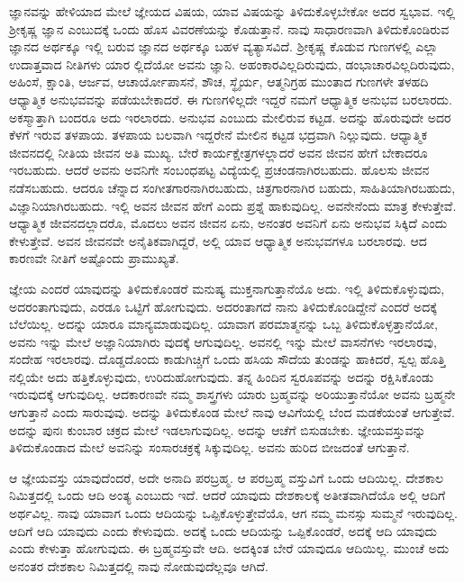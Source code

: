 ಜ್ಞಾನವನ್ನು ಹೇಳಿಯಾದ ಮೇಲೆ ಜ್ಞೇಯದ ವಿಷಯ, ಯಾವ ವಿಷಯನ್ನು ತಿಳಿದುಕೊಳ್ಳಬೇಕೋ ಅದರ ಸ್ವಭಾವ. ಇಲ್ಲಿ ಶ‍್ರೀಕೃಷ್ಣ ಜ್ಞಾನ ಎಂಬುದಕ್ಕೆ ಒಂದು ಹೊಸ ವಿವರಣೆಯನ್ನು ಕೊಡುತ್ತಾನೆ. ನಾವು ಸಾಧಾರಣವಾಗಿ ತಿಳಿದುಕೊಂಡಿರುವ ಜ್ಞಾನದ ಅರ್ಥಕ್ಕೂ ಇಲ್ಲಿ ಬರುವ ಜ್ಞಾನದ ಅರ್ಥಕ್ಕೂ ಬಹಳ ವ್ಯತ್ಯಾಸವಿದೆ. ಶ‍್ರೀಕೃಷ್ಣ ಕೊಡುವ ಗುಣಗಳಲ್ಲಿ ಎಲ್ಲಾ ಉದಾತ್ತವಾದ ನೀತಿಗಳು ಯಾರ ಲ್ಲಿದೆಯೋ ಅವನು ಜ್ಞಾನಿ. ಅಹಂಕಾರವಿಲ್ಲದಿರುವುದು, ಡಂಭಾಚಾರವಿಲ್ಲದಿರುವುದು, ಅಹಿಂಸೆ, ಕ್ಷಾಂತಿ, ಆರ್ಜವ, ಆಚಾರ್ಯೋಪಾಸನೆ, ಶೌಚ, ಸ್ಥೈರ್ಯ, ಆತ್ಮನಿಗ್ರಹ ಮುಂತಾದ ಗುಣಗಳೇ ತಳಹದಿ ಆಧ್ಯಾತ್ಮಿಕ ಅನುಭವವನ್ನು ಪಡೆಯಬೇಕಾದರೆ. ಈ ಗುಣಗಳಿಲ್ಲದೇ ಇದ್ದರೆ ನಮಗೆ ಆಧ್ಯಾತ್ಮಿಕ ಅನುಭವ ಬರಲಾರದು. ಅಕಸ್ಮಾತ್ತಾಗಿ ಬಂದರೂ ಅದು ಇರಲಾರದು. ಅನುಭವ ಎಂಬುದು ಮೇಲಿರುವ ಕಟ್ಟಡ. ಅದನ್ನು ಹೊರುವುದೇ ಅದರ ಕೆಳಗೆ ಇರುವ ತಳಪಾಯ. ತಳಪಾಯ ಬಲವಾಗಿ ಇದ್ದರೇನೆ ಮೇಲಿನ ಕಟ್ಟಡ ಭದ್ರವಾಗಿ ನಿಲ್ಲುವುದು. ಆಧ್ಯಾತ್ಮಿಕ ಜೀವನದಲ್ಲಿ ನೀತಿಯ ಜೀವನ ಅತಿ ಮುಖ್ಯ. ಬೇರೆ ಕಾರ್ಯಕ್ಷೇತ್ರಗಳಲ್ಲಾದರೆ ಅವನ ಜೀವನ ಹೇಗೆ ಬೇಕಾದರೂ ಇರಬಹುದು. ಆದರೆ ಅವನು ಅವನಿಗೇ ಸಂಬಂಧಪಟ್ಟ ವಿದ್ಯೆಯಲ್ಲಿ ಪ್ರಚಂಡನಾಗಿರಬಹುದು. ಹೊಲಸು ಜೀವನ ನಡೆಸಬಹುದು. ಆದರೂ ಚೆನ್ನಾದ ಸಂಗೀತಗಾರನಾಗಿರಬಹುದು, ಚಿತ್ರಗಾರನಾಗಿರ ಬಹುದು, ಸಾಹಿತಿಯಾಗಿರಬಹುದು, ವಿಜ್ಞಾನಿಯಾಗಿರಬಹುದು. ಇಲ್ಲಿ ಅವನ ಜೀವನ ಹೇಗೆ ಎಂದು ಪ್ರಶ್ನೆ ಹಾಕುವುದಿಲ್ಲ. ಅವನೇನೆಂದು ಮಾತ್ರ ಕೇಳುತ್ತೇವೆ. ಆಧ್ಯಾತ್ಮಿಕ ಜೀವನದಲ್ಲಾದರೊ, ಮೊದಲು ಅವನ ಜೀವನ ಏನು, ಅನಂತರ ಅವನಿಗೆ ಏನು ಅನುಭವ ಸಿಕ್ಕಿದೆ ಎಂದು ಕೇಳುತ್ತೇವೆ. ಅವನ ಜೀವನವೇ ಅನೈತಿಕವಾಗಿದ್ದರೆ, ಅಲ್ಲಿ ಯಾವ ಆಧ್ಯಾತ್ಮಿಕ ಅನುಭವಗಳೂ ಬರಲಾರವು. ಆದ ಕಾರಣವೇ ನೀತಿಗೆ ಅಷ್ಟೊಂದು ಪ್ರಾಮುಖ್ಯತೆ.

ಜ್ಞೇಯ ಎಂದರೆ ಯಾವುದನ್ನು ತಿಳಿದುಕೊಂಡರೆ ಮನುಷ್ಯ ಮುಕ್ತನಾಗುತ್ತಾನೆಯೊ ಅದು. ಇಲ್ಲಿ ತಿಳಿದುಕೊಳ್ಳುವುದು, ಅದರಂತಾಗುವುದು, ಎರಡೂ ಒಟ್ಟಿಗೆ ಹೋಗುವುದು. ಅದರಂತಾಗದೆ ನಾನು ತಿಳಿದುಕೊಂಡಿದ್ದೇನೆ ಎಂದರೆ ಅದಕ್ಕೆ ಬೆಲೆಯಿಲ್ಲ. ಅದನ್ನು ಯಾರೂ ಮಾನ್ಯಮಾಡುವುದಿಲ್ಲ. ಯಾವಾಗ ಪರಮಾತ್ಮನನ್ನು ಒಬ್ಬ ತಿಳಿದುಕೊಳ್ಳತ್ತಾನೆಯೋ, ಅವನು ಇನ್ನು ಮೇಲೆ ಅಜ್ಞಾನಿಯಾಗಿರು ವುದಕ್ಕೆ ಆಗುವುದಿಲ್ಲ. ಅವನಲ್ಲಿ ಇನ್ನು ಮೇಲೆ ವಾಸನೆಗಳು ಇರಲಾರವು, ಸಂದೇಹ ಇರಲಾರವು. ದೊಡ್ಡದೊಂದು ಕಾಡುಗಿಚ್ಚಿಗೆ ಒಂದು ಹಸಿಯ ಸೌದೆಯ ತುಂಡನ್ನು ಹಾಕಿದರೆ, ಸ್ವಲ್ಪ ಹೊತ್ತಿ ನಲ್ಲಿಯೇ ಅದು ಹತ್ತಿಕೊಳ್ಳುವುದು, ಉರಿದುಹೋಗುವುದು. ತನ್ನ ಹಿಂದಿನ ಸ್ವರೂಪವನ್ನು ಅದನ್ನು ರಕ್ಷಿಸಿಕೊಂಡು ಇರುವುದಕ್ಕೆ ಆಗುವುದಿಲ್ಲ. ಆದಕಾರಣವೇ ನಮ್ಮ ಶಾಸ್ತ್ರಗಳು ಯಾರು ಬ್ರಹ್ಮವನ್ನು ಅರಿಯುತ್ತಾನೆಯೋ ಅವನು ಬ್ರಹ್ಮನೇ ಆಗುತ್ತಾನೆ ಎಂದು ಸಾರುವುವು. ಅದನ್ನು ತಿಳಿದುಕೊಂಡ ಮೇಲೆ ನಾವು ಆವಿಗೆಯಲ್ಲಿ ಬೆಂದ ಮಡಕೆಯಂತೆ ಆಗುತ್ತೇವೆ. ಅದನ್ನು ಪುನಃ ಕುಂಬಾರ ಚಕ್ರದ ಮೇಲೆ ಇಡಲಾಗುವುದಿಲ್ಲ. ಅದನ್ನು ಆಚೆಗೆ ಬಿಸುಡಬೇಕು. ಜ್ಞೇಯವಸ್ತುವನ್ನು ತಿಳಿದುಕೊಂಡಾದ ಮೇಲೆ ಅವನಿನ್ನು ಸಂಸಾರಚಕ್ರಕ್ಕೆ ಸಿಕ್ಕುವುದಿಲ್ಲ. ಅವನು ಹುರಿದ ಬೀಜದಂತೆ ಆಗುತ್ತಾನೆ.

ಆ ಜ್ಞೇಯವಸ್ತು ಯಾವುದೆಂದರೆ, ಅದೇ ಅನಾದಿ ಪರಬ್ರಹ್ಮ. ಆ ಪರಬ್ರಹ್ಮ ವಸ್ತುವಿಗೆ ಒಂದು ಆದಿಯಿಲ್ಲ. ದೇಶಕಾಲ ನಿಮಿತ್ತದಲ್ಲಿ ಒಂದು ಆದಿ ಅಂತ್ಯ ಎಂಬುದು ಇದೆ. ಆದರೆ ಯಾವುದು ದೇಶಕಾಲಕ್ಕೆ ಅತೀತವಾಗಿದೆಯೊ ಅಲ್ಲಿ ಆದಿಗೆ ಅರ್ಥವಿಲ್ಲ. ನಾವು ಯಾವಾಗ ಒಂದು ಆದಿಯನ್ನು ಒಪ್ಪಿಕೊಳ್ಳುತ್ತೇವೆಯೊ, ಆಗ ನಮ್ಮ ಮನಸ್ಸು ಸುಮ್ಮನೆ ಇರುವುದಿಲ್ಲ. ಆದಿಗೆ ಆದಿ ಯಾವುದು ಎಂದು ಕೇಳುವುದು. ಅದಕ್ಕೆ ಒಂದು ಆದಿಯನ್ನು ಒಪ್ಪಿಕೊಂಡರೆ, ಅದಕ್ಕೆ ಆದಿ ಯಾವುದು ಎಂದು ಕೇಳುತ್ತಾ ಹೋಗುವುದು. ಈ ಬ್ರಹ್ಮವಸ್ತುವೇ ಆದಿ. ಅದಕ್ಕಿಂತ ಬೇರೆ ಯಾವುದೂ ಆದಿಯಿಲ್ಲ. ಮುಂಚೆ ಅದು ಅನಂತರ ದೇಶಕಾಲ ನಿಮಿತ್ತದಲ್ಲಿ ನಾವು ನೋಡುವುದೆಲ್ಲವೂ ಆಗಿದೆ.

